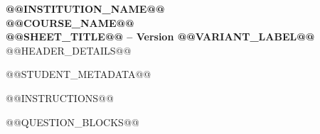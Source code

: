 \documentclass[11pt,a4paper]{article}
\begin{document}
\begin{center}
{\Large \textbf{@@INSTITUTION_NAME@@}}\\
{\large \textbf{@@COURSE_NAME@@}}\\
{\large \textbf{@@SHEET_TITLE@@ -- Version @@VARIANT_LABEL@@}}
@@HEADER_DETAILS@@
\end{center}

@@STUDENT_METADATA@@

@@INSTRUCTIONS@@

@@QUESTION_BLOCKS@@
\end{document}
